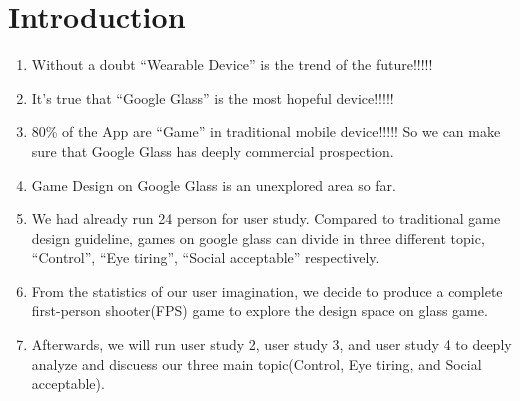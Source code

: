 \section{Introduction}




 

\begin{enumerate}
\item Without a doubt ``Wearable Device'' is the trend of the future!!!!!
\item It's true that ``Google Glass'' is the most hopeful device!!!!!
\item 80\% of the App are ``Game'' in traditional mobile device!!!!! So we can make sure that Google Glass has deeply commercial prospection.
\item Game Design on Google Glass is an unexplored area so far.
\item We had already run 24 person for user study. Compared to traditional game design guideline, games on google glass can divide in three different topic, ``Control'', ``Eye tiring'', ``Social acceptable'' respectively.
\item From the statistics of our user imagination, we decide to produce a complete first-person shooter(FPS) game to explore the design space on glass game.
\item Afterwards, we will run user study 2, user study 3, and user study 4 to deeply analyze and discuess our three main topic(Control, Eye tiring, and Social acceptable).
\end{enumerate}

